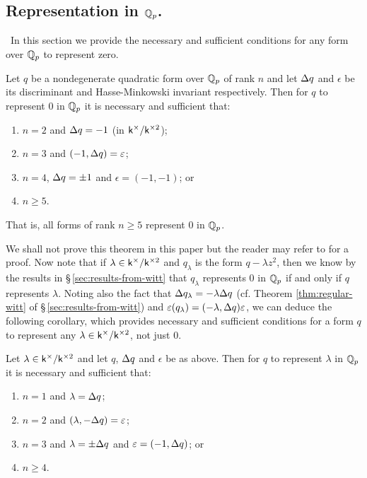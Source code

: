 \subsection{Representation in \(\mathbb{Q}_p\).}~In this section we provide the
necessary and sufficient conditions for any form over \(\mathbb{Q}_p\) to
represent zero.\label{sec:representation-in-qp-sec}

\begin{theoremx}\label{thm:rep-in-rationals-p} Let \(q\) be a nondegenerate
    quadratic form over \(\mathbb{Q}_p\) of rank \(n\) and let \({\Delta} q\) and
    \(\epsilon\) be its discriminant and Hasse-Minkowski invariant respectively.
    Then for \(q\) to represent \(0\) in \(\mathbb{Q}_p\) it is necessary and
    sufficient that:

    \smallskip

    \begin{enumerate}[nosep, label=(\alph*)]
        \item \(n = 2\) and \({\Delta} q = -1\) (in \(\mathsf{k}^{\times}/\mathsf{k}^{\times2}\));
        \item \(n = 3\) and \((-1, {\Delta} q) = \varepsilon\);
        \item \(n = 4\), \({\Delta} q = \pm 1\) and \(\epsilon = (-1, -1)\); or
        \item \(n \geq 5\).
    \end{enumerate}
    That is, all forms of rank \(n \geq 5\) represent \(0\) in \(\mathbb{Q}_p\).
\end{theoremx}

We shall not prove this theorem in this paper but the reader may refer to
\cite[pp.~36--39]{serre2012course} for a proof. Now note that if \(\lambda \in
\mathsf{k}^{\times}/\mathsf{k}^{\times2}\) and \(q_{\lambda}\) is the form \(q - \lambda z^2\), then we know
by the results in \S\,\ref{sec:results-from-witt} that \(q_{\lambda}\)
represents \(0\) in \(\mathbb{Q}_p\) if and only if \(q\) represents
\(\lambda\). Noting also the fact that \({\Delta} q_{\lambda} = -\lambda {\Delta}
q\) (cf. Theorem \ref{thm:regular-witt} of \S\,\ref{sec:results-from-witt}) and
\(\varepsilon(q_\lambda) = (-\lambda, {\Delta} q)\varepsilon\), we can deduce the
following corollary, which provides necessary and sufficient conditions for a
form \(q\) to represent any \(\lambda \in \mathsf{k}^{\times}/\mathsf{k}^{\times2}\), not just \(0\).

\begin{corollary}
    Let \(\lambda \in \mathsf{k}^{\times}/\mathsf{k}^{\times2}\) and let \(q\), \({\Delta} q\) and
    \(\epsilon\) be as above. Then for \(q\) to represent \(\lambda\) in
    \(\mathbb{Q}_p\) it is necessary and sufficient that:

    \smallskip

    \begin{enumerate}[nosep, label=(\alph*)]
        \item \(n = 1\) and \(\lambda = {\Delta} q\);
        \item \(n = 2\) and \((\lambda, -{\Delta} q) = \varepsilon\);
        \item \(n = 3\) and \(\lambda = \pm {\Delta} q\) and \(\varepsilon = (-1,
        {\Delta} q)\); or
        \item \(n \geq 4\).
    \end{enumerate}
\end{corollary}

